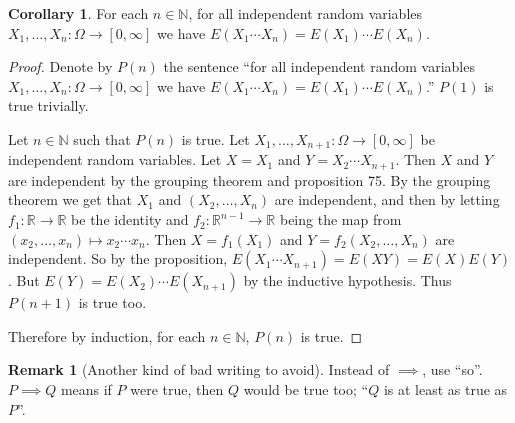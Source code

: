 \documentclass{article}
\newcommand{\N}{\mathbb{N}}
\theoremstyle{definition}
\newtheorem{corollary}[theorem]{Corollary}
\newtheorem*{remark}{Remark}
\begin{document}
\begin{corollary}
    For each $n \in \N$, for all independent random variables $X_1, \dots, X_n : \Omega \longrightarrow [0, \infty]$ we have $E(X_1 \cdots X_n) = E(X_1) \cdots E(X_n)$.
\end{corollary}
\begin{proof}
    Denote by $P(n)$ the sentence ``for all independent random variables $X_1, \dots, X_n : \Omega \longrightarrow [0, \infty]$ we have $E(X_1 \cdots X_n) = E(X_1) \cdots E(X_n)$.'' $P(1)$ is true trivially.
    
    Let $n \in \N$ such that $P(n)$ is true. Let $X_1, \dots, X_{n+1} : \Omega \longrightarrow [0, \infty]$ be independent random variables. Let $X = X_1$ and $Y = X_2\cdots X_{n+1}$. Then $X$ and $Y$ are independent by the grouping theorem and proposition 75. By the grouping theorem we get that $X_1$ and $(X_2, \dots, X_n)$ are independent, and then by letting $f_1:\mathbb{R}\to\mathbb{R}$ be the identity and $f_2:\mathbb{R}^{n - 1}\to \mathbb{R}$ being the map from $(x_2, \dots, x_n)\mapsto x_2\cdots x_n$. Then $X = f_1(X_1)$ and $Y = f_2(X_2, \dots, X_n)$ are independent. So by the proposition, $E(X_1 \cdots X_{n+1}) = E(XY) = E(X)E(Y)$. But $E(Y) = E(X_2) \cdots E(X_{n+1})$ by the inductive hypothesis. Thus $P(n+1)$ is true too.
    
    Therefore by induction, for each $n \in \N$, $P(n)$ is true.
\end{proof}

\begin{remark}[Another kind of bad writing to avoid]
     Instead of $\implies$, use ``so''. $P \implies Q$ means if $P$ were true, then $Q$ would be true too; ``$Q$ is at least as true as $P$''.
\end{remark}
\end{document}
